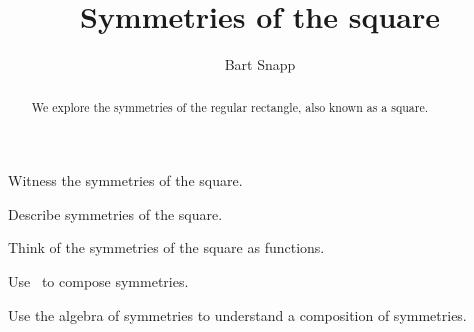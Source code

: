\documentclass[noauthor,nooutcomes,hints,handout]{ximera}
\title{Symmetries of the square}
\author{Bart Snapp}
\begin{document}
\begin{abstract}
  We explore the symmetries of the regular rectangle, also known as a
  square.
\end{abstract}
\maketitle

\begin{listOutcomes}
\item Witness the symmetries of the square.
\item Describe symmetries of the square.
\item Think of the symmetries of the square as functions.
\item Use \snap\ to compose symmetries.
\item Use the algebra of symmetries to understand a composition of
  symmetries.
\end{listOutcomes}
\mynewpage
\end{document}
